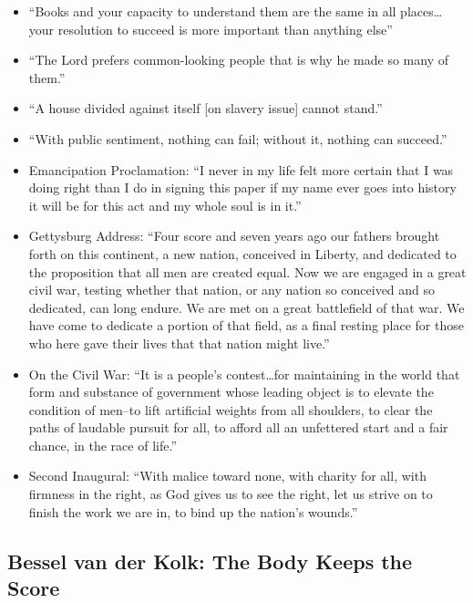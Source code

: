 \documentclass[
]{article}
\begin{document}
\begin{itemize}
\item
  ``Books and your capacity to understand them are the same in all
  places\ldots your resolution to succeed is more important than
  anything else''
\item
  ``The Lord prefers common-looking people that is why he made so many
  of them.''
\item
  ``A house divided against itself {[}on slavery issue{]} cannot
  stand.''
\item
  ``With public sentiment, nothing can fail; without it, nothing can
  succeed.''
\item
  Emancipation Proclamation: ``I never in my life felt more certain that
  I was doing right than I do in signing this paper if my name ever goes
  into history it will be for this act and my whole soul is in it.''
\item
  Gettysburg Address: ``Four score and seven years ago our fathers
  brought forth on this continent, a new nation, conceived in Liberty,
  and dedicated to the proposition that all men are created equal. Now
  we are engaged in a great civil war, testing whether that nation, or
  any nation so conceived and so dedicated, can long endure. We are met
  on a great battlefield of that war. We have come to dedicate a portion
  of that field, as a final resting place for those who here gave their
  lives that that nation might live.''
\item
  On the Civil War: ``It is a people's contest\ldots for maintaining in
  the world that form and substance of government whose leading object
  is to elevate the condition of men--to lift artificial weights from
  all shoulders, to clear the paths of laudable pursuit for all, to
  afford all an unfettered start and a fair chance, in the race of
  life.''
\item
  Second Inaugural: ``With malice toward none, with charity for all,
  with firmness in the right, as God gives us to see the right, let us
  strive on to finish the work we are in, to bind up the nation's
  wounds.''
\end{itemize}

\hypertarget{bessel-van-der-kolk-the-body-keeps-the-score}{%
\subsection{Bessel van der Kolk: The Body Keeps the
Score}\label{bessel-van-der-kolk-the-body-keeps-the-score}}
\end{document}

